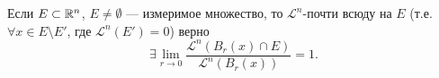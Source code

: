 \begin{corollary}
    Если $E \subset \mathbb{R}^n$, $E \neq \emptyset$ — измеримое множество, то $\mathcal{L}^n$-почти всюду на $E$ (т.е. $\forall x \in E \setminus E'$, где $\mathcal{L}^n(E') = 0$) верно
    \[\exists \lim\limits_{r \to 0} \frac{\mathcal{L}^n(B_r(x) \cap E)}{\mathcal{L}^n(B_r(x))} = 1.\]
\end{corollary}